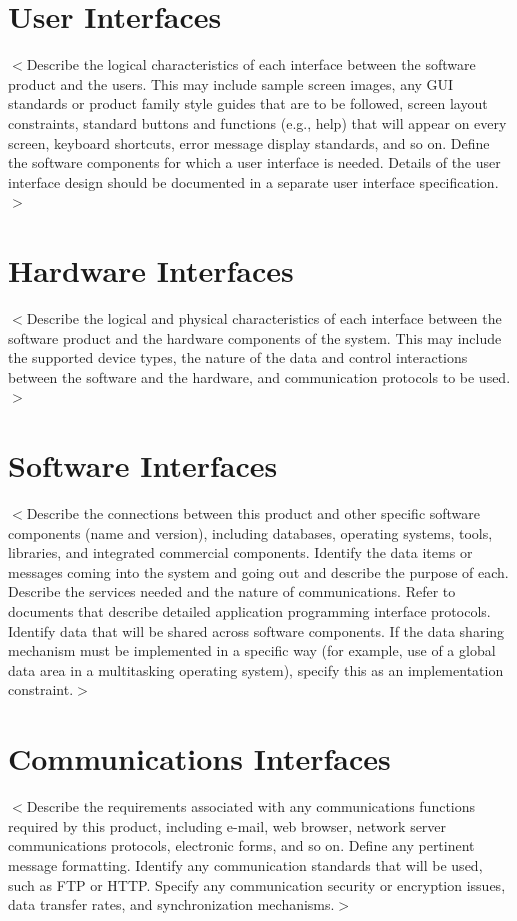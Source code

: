 \documentclass[oneside,a4paper,12pt,explicit]{book}
\begin{document}
\section{User Interfaces}
$<$Describe the logical characteristics of each interface between the software 
product and the users. This may include sample screen images, any GUI standards 
or product family style guides that are to be followed, screen layout 
constraints, standard buttons and functions (e.g., help) that will appear on 
every screen, keyboard shortcuts, error message display standards, and so on.  
Define the software components for which a user interface is needed. Details of 
the user interface design should be documented in a separate user interface 
specification.$>$

\section{Hardware Interfaces}
$<$Describe the logical and physical characteristics of each interface between 
the software product and the hardware components of the system. This may include 
the supported device types, the nature of the data and control interactions 
between the software and the hardware, and communication protocols to be 
used.$>$

\section{Software Interfaces}
$<$Describe the connections between this product and other specific software 
components (name and version), including databases, operating systems, tools, 
libraries, and integrated commercial components. Identify the data items or 
messages coming into the system and going out and describe the purpose of each.  
Describe the services needed and the nature of communications. Refer to 
documents that describe detailed application programming interface protocols.  
Identify data that will be shared across software components. If the data 
sharing mechanism must be implemented in a specific way (for example, use of a 
global data area in a multitasking operating system), specify this as an 
implementation constraint.$>$

\section{Communications Interfaces}
$<$Describe the requirements associated with any communications functions 
required by this product, including e-mail, web browser, network server 
communications protocols, electronic forms, and so on. Define any pertinent 
message formatting. Identify any communication standards that will be used, such 
as FTP or HTTP. Specify any communication security or encryption issues, data 
transfer rates, and synchronization mechanisms.$>$
\end{document}
